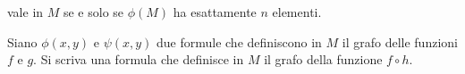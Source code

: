 vale in $M$ se e solo se $\phi(M)$ ha esattamente $n$ elementi.
\begin{comment}
\begin{remark}\label{infinitononprimordine}
Vedremo pi\`u avanti che non esiste modo si esprimere al prim'ordine la propriet\`a `$\phi(M)$ ha infiniti elementi'. %
Al momento possiamo per\`o chiarire cosa intendiamo: nel caso di una fissata cardinalit\`a finita, diciamo $n$, noi siamo riusciti a trovare un enunciato $\psi$ tale che in  ogni struttura $M$ 

\hfil$M\models\psi\ \ \IFF\ \ \phi(M)$ contiene almeno $n$ elementi.

L'enunciato $\psi$ \`e quello che quello che abbiamo denotato con $\E^{\ge n}x\,\phi(x)$. Esprimere al prim'ordine la propriet\`a: $\phi(M)$ ha infiniti elementi, significa trovare un enunciato $\psi$ tale che $\psi$ \`e vera in $M$ quando $\phi(M)$ contiene infiniti elementi. Vedremo che per qualche formula $\phi(x)$ questo non \`e possibile. (Il risultato sar\`a ancora pi\`u preciso: faremo vedere per quali formule $\phi(x)$ questo \`e possibile, per quali non \`e possibile.)\QED
\end{remark}

Concludiamo il paragrafo con una breve nota, un dettaglio, su cui \`e per\`o \`e meglio non inciampare. \`E vero che $\E x\,\phi(x)$ \`e una conseguenza logica di $\A x\,\phi(x)$~? La risposta affermativa sembra scontata. Invece, la risposta \`e negativa: la struttura vuota \`e un (in effetti, l'unico) controesempio. In una struttura vuota tutti gli enunciati che cominciano con un quantificatore universale sono veri perch\'e non esiste nessun possibile controesempio. Invece tutti gli enunciati che cominciano con un quantificatore esistenziale sono falsi perch\'e non esiste nessun possibile testimone. Noi non abbiamo escluso la possibili\`a che le strutture abbiano dominio vuoto. Qualche autore invece esclude le strutture con dominio vuoto, per loro $\E x\,\phi(x)$ \`e quindi una conseguenza logica di $\A x\,\phi(x)$.
\end{comment}
\begin{exercise}
Siano $\phi(x,y)$ e  $\psi(x,y)$ due formule che definiscono in $M$ il grafo delle funzioni $f$ e $g$. Si scriva una formula che definisce in $M$ il grafo della funzione $f\circ h$.
\end{exercise}

